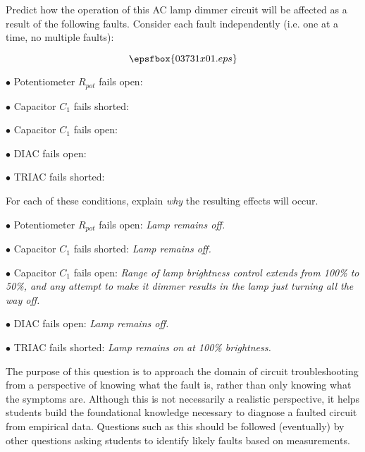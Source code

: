 

Predict how the operation of this AC lamp dimmer circuit will be affected as a result of the following faults.  Consider each fault independently (i.e. one at a time, no multiple faults):

$$\epsfbox{03731x01.eps}$$

\medskip
\item{$\bullet$} Potentiometer $R_{pot}$ fails open:
\vskip 5pt
\item{$\bullet$} Capacitor $C_1$ fails shorted:
\vskip 5pt
\item{$\bullet$} Capacitor $C_1$ fails open:
\vskip 5pt
\item{$\bullet$} DIAC fails open:
\vskip 5pt
\item{$\bullet$} TRIAC fails shorted:
\medskip

For each of these conditions, explain {\it why} the resulting effects will occur.







\medskip
\item{$\bullet$} Potentiometer $R_{pot}$ fails open: {\it Lamp remains off.}
\vskip 5pt
\item{$\bullet$} Capacitor $C_1$ fails shorted: {\it Lamp remains off.}
\vskip 5pt
\item{$\bullet$} Capacitor $C_1$ fails open: {\it Range of lamp brightness control extends from 100\% to 50\%, and any attempt to make it dimmer results in the lamp just turning all the way off.}
\vskip 5pt
\item{$\bullet$} DIAC fails open: {\it Lamp remains off.}
\vskip 5pt
\item{$\bullet$} TRIAC fails shorted: {\it Lamp remains on at 100\% brightness.}
\medskip







The purpose of this question is to approach the domain of circuit troubleshooting from a perspective of knowing what the fault is, rather than only knowing what the symptoms are.  Although this is not necessarily a realistic perspective, it helps students build the foundational knowledge necessary to diagnose a faulted circuit from empirical data.  Questions such as this should be followed (eventually) by other questions asking students to identify likely faults based on measurements.




